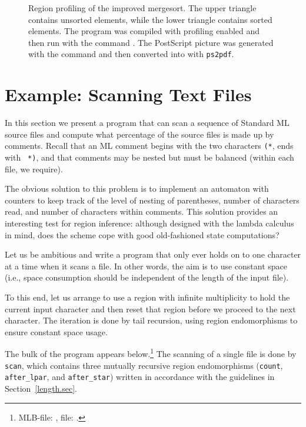\documentclass[12pt]{book}
\begin{document}
\begin{figure}
%
%
%
%
\caption{Region profiling of the improved mergesort.
  The upper triangle contains unsorted elements, while the lower
  triangle contains sorted elements.  The program was compiled with
  profiling enabled and then run with the command .
  The PostScript picture  was generated
  with the command 
  and then converted into  with \texttt{ps2pdf}.}
\label{msortreset.fig}
\end{figure}

\section{Example: Scanning Text Files}
\label{scan.sec}
In this section we present a program that can
%
scan a sequence of Standard ML source files and compute what
percentage of the source files is made up by comments. Recall that an
ML comment begins with the two characters {\tt (*}, ends with {\tt
  *)}, and that comments may be nested but must be balanced (within
each file, we require).

The obvious solution to this problem is to implement an automaton with
counters to keep track of the level of nesting of parentheses, number
of characters read, and number of characters within comments. This solution
provides an interesting test for region inference: although designed
with the lambda calculus in mind, does the scheme cope with good
old-fashioned state computations?

Let us be ambitious and write a program that only ever holds on to one
character at a time when it scans a file. In other words, the aim is
to use constant space (i.e., space consumption should be independent
of the length of the input file).

To this end, let us arrange to use a region with infinite multiplicity to
hold the current input character and then reset that region before we proceed
to the next character. The iteration is done by tail recursion, using region
endomorphisms to ensure constant space usage.

The bulk of the program appears below.\footnote{MLB-file:
  , file: .} The
scanning of a single file is done by {\tt scan}, which contains three
mutually recursive region endomorphisms ({\tt count}, {\tt
  after\_lpar}, and {\tt after\_star}) written in accordance with
the guidelines in Section~\ref{length.sec}.
\end{document}
